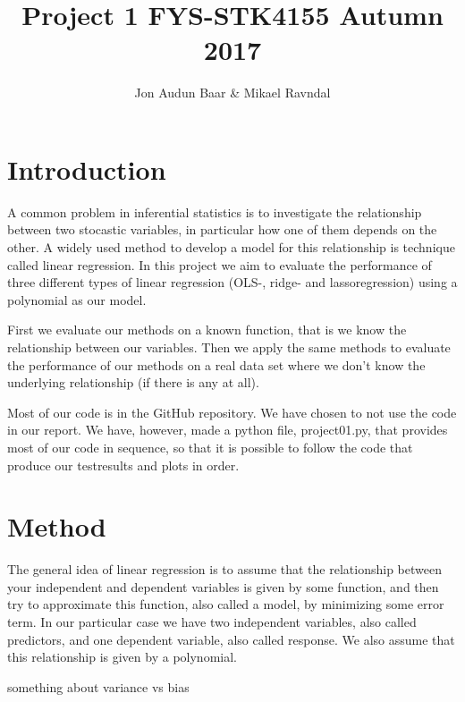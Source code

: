 \documentclass[a4paper,norsk]{article}
\title {Project 1 FYS-STK4155 Autumn 2017}
\author {Jon Audun Baar \& Mikael Ravndal}
\begin{document}
\maketitle

\section{Introduction}
A common problem in inferential statistics is to investigate the 
relationship between two stocastic variables, in particular how one 
of them depends on the other. A widely used method to develop a 
model for this relationship is technique called linear regression. 
In this project 
we aim to evaluate the performance of three different types of 
linear regression (OLS-, ridge- and lassoregression) 
using a polynomial as our model.
\par First we evaluate our methods on a known function, that is we know 
the relationship between our variables. Then we apply the same methods 
to evaluate the performance of our methods on a real data set where 
we don’t know the underlying relationship (if there is any at all).
\par Most of our code is in the GitHub repository. We have chosen to not use the code in our report. We have, however, made a python file, 
project01.py, that provides most of our code in sequence, 
so that it is possible to follow the code that produce our testresults 
and plots in order.

\section{Method}
The general idea of linear regression is to assume that the relationship 
between your independent and dependent variables is given by some function,
and then try to approximate this function, also called a model, 
by minimizing some error term. 
In our particular case we have two independent variables, 
also called predictors, and one dependent variable, also called response. 
We also assume that this relationship is given by a polynomial. 
\par 
something about variance vs bias
\end{document}
